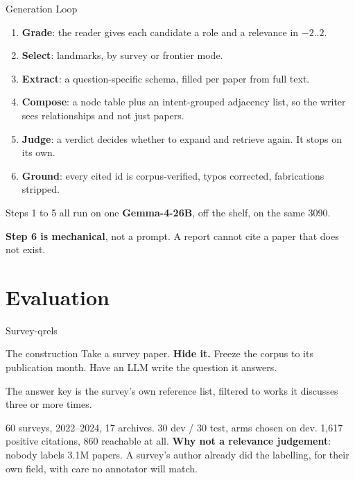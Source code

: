 \documentclass[aspectratio=169, 11pt]{beamer}
\let\oldtextbf\textbf
\renewcommand{\textbf}[1]{{\color{ktertiary}\oldtextbf{#1}}}
\begin{document}
\begin{frame}{Generation Loop}
  \begin{enumerate}
    \item \textbf{Grade}: the reader gives each candidate a role and a relevance in $-2..2$.
    \item \textbf{Select}: landmarks, by survey or frontier mode.
    \item \textbf{Extract}: a question-specific schema, filled per paper from full text.
    \item \textbf{Compose}: a node table plus an intent-grouped adjacency list, so the writer
          sees relationships and not just papers.
    \item \textbf{Judge}: a verdict decides whether to expand and retrieve again. It stops on its own.
    \item \textbf{Ground}: every cited id is corpus-verified, typos corrected, fabrications stripped.
  \end{enumerate}
  Steps 1 to 5 all run on one \textbf{Gemma-4-26B}, off the shelf, on the same 3090.
  \medskip

  \textbf{Step 6 is mechanical}, not a prompt. A report cannot cite a paper that does not exist.
\end{frame}

\section{Evaluation}

\begin{frame}{Survey-qrels}
  \begin{kbox}{The construction}
    Take a survey paper. \textbf{Hide it.} Freeze the corpus to its publication month. Have an
    LLM write the question it answers.

    The answer key is the survey's own reference list, filtered to works it discusses three or
    more times.
  \end{kbox}
  60 surveys, 2022--2024, 17 archives. 30 dev / 30 test, arms chosen on dev. 1,617 positive citations,
  860 reachable at all.
  \medskip
  \textbf{Why not a relevance judgement}: nobody labels 3.1M papers. A survey's author already
  did the labelling, for their own field, with care no annotator will match.
\end{frame}
\end{document}
